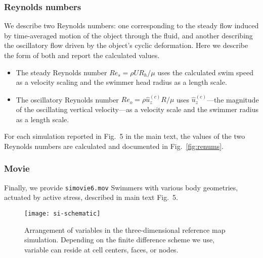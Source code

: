 \documentclass[times, 10pt]{article}
\newcommand{\Rey}{\textit{Re}}
\begin{document}
        \subsubsection*{Reynolds numbers} We describe two Reynolds numbers: one corresponding to the steady flow induced by time-averaged motion of the object through the fluid, and another describing the oscillatory flow driven by the object's cyclic deformation. Here we describe the form of both and report the calculated values.
        
        \begin{itemize}
            \item The steady Reynolds number $\Rey_s = \rho U R_h/\mu$ uses the calculated swim speed as a velocity scaling and the swimmer head radius as a length scale.
            \item The oscillatory Reynolds number $\Rey_o = \rho \hat{u}^{(c)}_z R / \mu$ uses $\hat{u}^{(c)}_z$---the magnitude of the oscillating vertical velocity---as a velocity scale and the swimmer radius as a length scale.
        \end{itemize}
        
        For each simulation reported in Fig.~5 in the main text, the values of the two Reynolds numbers are calculated and documented in Fig.~\ref{fig:renums}.

          \subsubsection*{Movie} Finally, we provide \texttt{si\textunderscore movie\textunderscore 6.mov}
        {Swimmers with various body geometries, actuated by active stress, described in main text Fig.~5.}


\newpage

            \begin{figure}
              \centering
               \texttt{[image: si-schematic]}
               \caption{
              Arrangement of variables in the three-dimensional reference map simulation. Depending on the finite difference scheme we use, variable can reside at cell centers, faces, or nodes.
              \label{fig:var_arr}}
            \end{figure}
\end{document}
